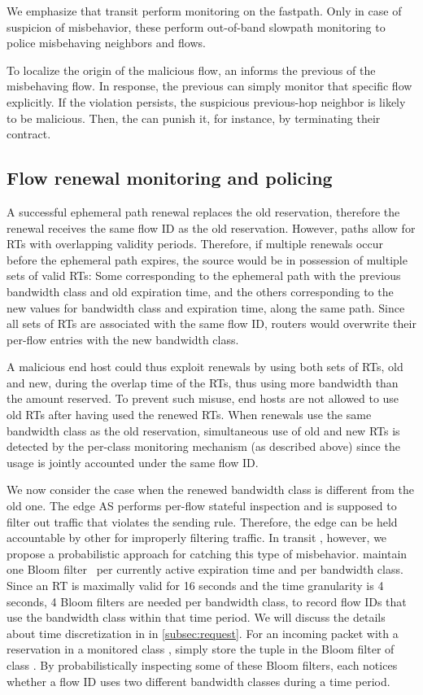 We emphasize that transit \ADs perform monitoring on the fastpath.  Only in
case of suspicion of misbehavior, these \ADs perform out-of-band slowpath
monitoring to police misbehaving neighbors and flows.

To localize the origin \AD of the malicious flow, an \AD informs the previous
\AD of the misbehaving flow. In response, the previous \AD can simply monitor
that specific flow explicitly.  If the violation persists, the suspicious
previous-hop neighbor is likely to be malicious. Then, the \AD can punish it,
for instance, by terminating their contract.


\subsection{Flow renewal monitoring and policing}\label{sec:monitoring-policing}
\label{sec:mon_renew}

\noindent
A successful ephemeral path renewal replaces the old
reservation, therefore the renewal receives the same flow ID as the old
reservation.  However, \name paths allow for RTs with
overlapping validity periods. Therefore, if multiple renewals occur before the
ephemeral path expires, the source would be in possession of multiple sets of
valid RTs: Some corresponding to the ephemeral path with the previous bandwidth class
and old expiration time, and the others corresponding to the new values for
bandwidth class and expiration time, along the same path.  Since all sets of
RTs are associated with the same flow ID, routers would overwrite their
per-flow entries with the new bandwidth class.

A malicious end host could thus exploit renewals by using both sets of RTs, old
and new, during the overlap time of the RTs, thus using more bandwidth than the
amount reserved. To prevent such misuse, end hosts are not allowed to use old
RTs after having used the renewed RTs. When renewals use the same bandwidth
class as the old reservation, simultaneous use of old and new RTs is detected
by the per-class monitoring mechanism (as described above) since the usage is
jointly accounted under the same flow ID.

We now consider the case when the renewed bandwidth class is different from the
old one. The edge AS performs per-flow stateful inspection and is supposed to
filter out traffic that violates the sending rule. Therefore, the edge \AD can
be held accountable by other \ADs for improperly filtering traffic. In transit
\ADs, however, we propose a probabilistic approach for catching this type of
misbehavior. \ADs maintain one Bloom filter~\cite{bloom} per currently active
expiration time and per bandwidth class. Since an RT is maximally valid for 16
seconds and the time granularity is 4 seconds, 4 Bloom filters are needed per
bandwidth class, to record flow IDs that use the bandwidth class within that
time period. We will discuss the details about time discretization in \name in
\autoref{subsec:request}. For an incoming packet with a reservation in a
monitored class , \ADs simply store the tuple  in the Bloom filter of class . By
probabilistically inspecting some of these Bloom filters, each \AD notices
whether a flow ID uses two different bandwidth classes during a time period.

